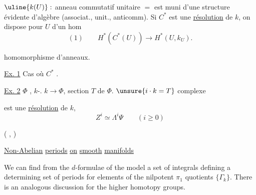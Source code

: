 $\uline{k(U)}:$  anneau commutatif unitaire
$=$ 
est muni d'une structure évidente d'algèbre 
(associat., unit., anticomm).
Si $C^*$ est une \uline{résolution} de $k$, on dispose pour $U$ d'un hom
\[
(1)\qquad H^*(C^*(U))\longrightarrow H^*(U,k_U).
\]

 homomorphisme d'anneaux.
  \uline{} 

\uline{Ex. 1} Cas où $C^*$ .

\uline{Ex. 2} $\Phi$  
,  $k$-.
 $k\longrightarrow\Phi$,  
section $T$ de $\Phi$.  $\unsure{i\cdot k=T}$
 complexe


est une \uline{résolution} de $k$, 
\[
Z^i\simeq\Lambda^i\Psi\qquad(i\geq0)
\]

(   ,
  
)

\uline{Non-Abelian} \uline{periods} \uline{on} \uline{smooth} \uline{manifolds}

We can find from the $d$-formulae of the model a set
of integrals defining a determining set of periods for
elements of the nilpotent $\pi_1$ quotients $\{\Gamma_k\}$. There is an
analogous discussion for the higher homotopy groups.

